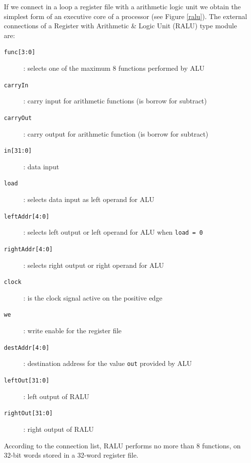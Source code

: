 If we connect in a loop a register file with a arithmetic logic unit we obtain the simplest form of an executive core of a processor (see Figure \ref{ralu}). The external connections of a Register with Arithmetic \& Logic Unit (RALU) type module are:
\begin{description}
    \item[{\tt func[3:0]}]: selects one of the maximum 8 functions performed by ALU
    \item[{\tt carryIn}]: carry input for arithmetic functions (is borrow for subtract)
    \item[{\tt carryOut}]: carry output for arithmetic function (is borrow for subtract)
    \item[{\tt in[31:0]}]: data input
    \item[{\tt load}]: selects data input as left operand for ALU
    \item[{\tt leftAddr[4:0]}]: selects left output or left operand for ALU when {\tt load = 0}
    \item[{\tt rightAddr[4:0]}]: selects right output or right operand for ALU
    \item[{\tt clock}]: is the clock signal active on the positive edge
    \item[{\tt we}]: write enable for the register file
    \item[{\tt destAddr[4:0]}]: destination address for the value {\tt out} provided by ALU
    \item[{\tt leftOut[31:0]}]: left output of RALU
    \item[{\tt rightOut[31:0]}]: right output of RALU
\end{description}
According to the connection list, RALU performs no more than 8 functions, on 32-bit words stored in a 32-word register file.


